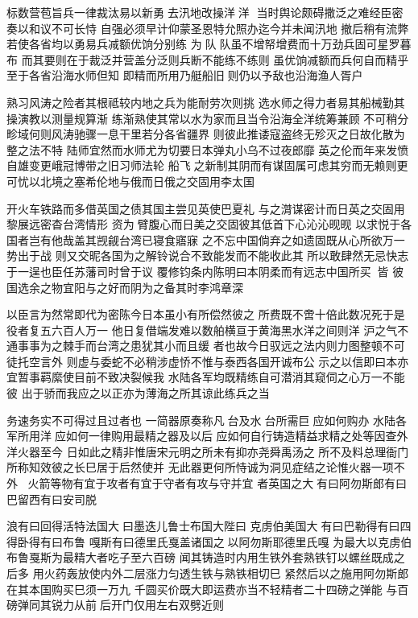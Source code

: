 \documentclass[a4paper,12pt,UTF8,twoside]{ctexbook}
\begin{document}
标数营苞旨兵一律裁汰易以新勇𢸑去汛地改操洋𬬰洋
𪿫当时舆论颇碍撒泛之难经臣密奏以和议不可长恃
自强必须早计仰蒙圣恩特允照办迄今并未闻汛地
撤后稍有流弊若使各省均以勇易兵减额优饷分别练
为𪿫队𬬰队虽不增帑增费而十万劲兵固可星罗暮布
而其要则在于裁泛并营盖分泛则兵断不能练不练则
虽优饷减额而兵何自而精乎至于各省沿海水师但知
即精而所用乃艇船旧𪿫则仍以予敌也沿海渔人胥户

熟习风涛之险者其根祗较内地之兵为能耐劳次则挑
选水师之得力者易其船械勤其操演教以测量规算渐
练渐熟使其常以水为家而且当令沿海全洋统筹兼顾
不可稍分畛域何则风涛驰骤一息干里若分各省疆界
则彼此推诿寇盗终无殄灭之日故化散为整之法不特
陆师宜然而水师尤为切要日本弹丸小乌不过夜郎靡
英之伦而年来发愤自雄变更峨冠博带之旧习师法轮
船飞𪿫之新制其阴而有谋固属可虑其穷而无赖则更
可忧以北境之塞希伦地与俄而日俄之交固用李太国

开火车铁路而多借英国之债其国主尝见英使巴夏礼
与之潸谋密计而日英之交固用黎展远密杳台湾情形
资为𭎡臂腹心而日美之交固彼其低首下心沁沁𬀪𬀪
以求悦于各国者岂有他哉盖其觊觎台湾已寝食寤寐
之不忘中国倘弃之如遗固既从心所欲万一势出于战
则又交昵各国为之解铃说合不致能发而不能收此其
所以敢肆然无忌快志于一逞也臣任苏藩司时曾于议
覆修钧条内陈明曰本阴柔而有远志中国所买𬬰𪿫皆
彼国选余之物宜阳与之好而阴为之备其时李鸿章深

以臣言为然常即代为密陈今日本虽小有所偿然彼之
所费既不啻十倍此数况死于是役者复五六百人万一
他日复借端发难以数舶横亘于黄海黑水洋之间则洋
沪之气不通事事为之棘手而台湾之患犹其小而且缓
者也故今日驭远之法内则力图整顿不可徒托空言外
则虚与委蛇不必稍涉虚㤭不惟与泰西各国开诚布公
示之以信即曰本亦宜暂事羁縻使目前不致决裂候我
水陆各军均既精练自可潜消其窥伺之心万一不能彼
出于骄而我应之以正亦为薄海之所其谅此练兵之当

务速务实不可得过且过者也
一简器原奏称凡𪿫台及水𪿫台所需巨𪿫应如何购办
水陆各军所用洋𬬰应如何一律购用最精之器及以后
应如何自行铸造精益求精之处等因查外洋火器至今
日如此之精非惟唐宋元明之所未有抑亦尧舜禹汤之
所不及料总理衙门所称知效彼之长巳居于后然使并
无此器更何所恃诚为洞见症结之论惟火器一项不外
𪿫𬬰火箭等物有宜于攻者有宜于守者有攻与守并宜
者英国之大𪿫有曰阿勿斯郎有曰巴留西有曰安司脱

浪有曰回得活特法国大𪿫曰墨迭儿鲁士布国大陛曰
克虏伯美国大𪿫有曰巴勒得有曰四得卧得有曰布鲁
嘎斯有曰德里氏戛盖诸国之𪿫以阿勿斯耶德里氏嘎
为最大以克虏伯布鲁戛斯为最精大者吃子至六百磅
闻其铸造时内用生铁外套熟铁钉以螺丝既成之后多
用火药轰放使内外二层涨力匀透生铁与熟铁相切巳
紧然后以之施用阿勿斯郎在其本国购买巳须一万九
千圆买价既大即运费亦当不轻精者二十四磅之弹能
与百磅弹同其锐力从前𪿫后开门仅用左右双劈近则
\end{document}
